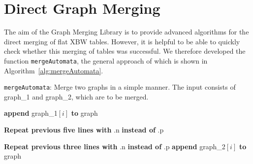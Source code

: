 \documentclass[a4paper,12pt,twoside,BCOR=10mm]{scrbook}
\begin{document}
\section{Direct Graph Merging}
\label{sec:direct_graph_merging}

The aim of the Graph Merging Library is to provide advanced algorithms
for the direct merging of flat XBW tables.
However, it is helpful to be able to quickly check whether this merging of tables
was successful.
We therefore developed the function \texttt{mergeAutomata},
the general approach of which is shown in Algorithm~\ref{alg:mergeAutomata}.
\begin{algorithm}
\caption[\texttt{mergeAutomata}: Merge two graphs]{\texttt{mergeAutomata}: Merge two graphs in a simple manner. The input consists of graph\_1 and graph\_2, which are to be merged.}
\label{alg:mergeAutomata}
\begin{algorithmic}[1]


\State \phantom{nl}

	\Else
		\State \textbf{append} graph\_1$[ i ]$ \textbf{to} graph
	\EndIf
\EndFor

\State \phantom{nl}

\EndFor

\State \phantom{nl}

		\EndIf
	\EndFor
	\State \textbf{Repeat previous five lines with} .n \textbf{instead of} .p
\EndFor

\State \phantom{nl}

	\EndFor
	\State \textbf{Repeat previous three lines with} .n \textbf{instead of} .p
	\State \textbf{append} graph\_2$[ i ]$ \textbf{to} graph
\EndFor


\end{algorithmic}
\end{algorithm}
\end{document}
